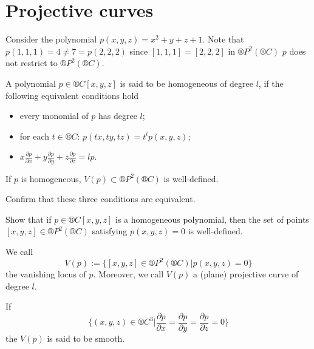 \documentclass[12pt]{article}					%
\begin{document}
\section{Projective curves}
\begin{priklad}
	Consider the polynomial $p(x, y, z) = x^2 + y + z + 1$. Note that $p(1, 1, 1) = 4 ≠ 7 = p(2, 2, 2)$ since $[1, 1, 1] = [2, 2, 2]$ in $®P^2(®C)$ $p$ does not restrict to $®P^2(®C)$.
\end{priklad}

\begin{definice}
	A polynomial $p \in ®C[x, y, z]$ is said to be homogeneous of degree $l$, if the following equivalent conditions hold
	\begin{itemize}
		\item every monomial of $p$ has degree $l$;
		\item for each $t \in ®C$: $p(tx, ty, tz) = t^l p(x, y, z)$;
		\item $x \frac{\partial p}{\partial x} + y \frac{\partial p}{\partial y} + z \frac{\partial p}{\partial z} = lp$.
	\end{itemize}

	\begin{dusledekin}
		If $p$ is homogeneous, $V(p) \subset ®P^2(®C)$ is well-defined.
	\end{dusledekin}
\end{definice}


\begin{priklad}
	Confirm that these three conditions are equivalent.
\end{priklad}

\begin{priklad}
	Show that if $p \in ®C[x, y, z]$ is a homogeneous polynomial, then the set of points $[x, y, z] \in ®P^2(®C)$ satisfying $p(x, y, z) = 0$ is well-defined.
\end{priklad}

\begin{definice}
	We call
	$$ V(p) := \{[x, y, z] \in ®P^2(®C) | p(x, y, z) = 0\} $$
	the vanishing locus of $p$. Moreover, we call $V(p)$ a (plane) projective curve of degree $l$.

	If
	$$ \{(x, y, z) \in ®C^3 | \frac{\partial p}{\partial x} = \frac{\partial p}{\partial y} = \frac{\partial p}{\partial z} = 0\} $$
	the $V(p)$ is said to be smooth.
\end{definice}
\end{document}
